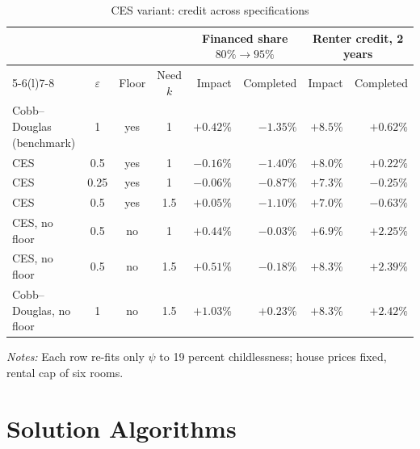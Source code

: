 \begin{table}[t]
\centering
\caption{CES variant: credit across specifications}
\label{tab:app-ces-credit}
\small\setlength{\tabcolsep}{4pt}
\begin{tabularx}{\textwidth}{@{}Xccc rr rr@{}}
\toprule
 & & & & \multicolumn{2}{c}{Financed share $80\%\to95\%$} & \multicolumn{2}{c}{Renter credit, 2 years} \\
\cmidrule(lr){5-6}\cmidrule(l){7-8}
 & $\varepsilon$ & Floor & Need $k$ & Impact & Completed & Impact & Completed \\
\midrule
Cobb--Douglas (benchmark) & 1 & yes & 1 & $+0.42\%$ & $-1.35\%$ & $+8.5\%$ & $+0.62\%$ \\
CES & 0.5 & yes & 1 & $-0.16\%$ & $-1.40\%$ & $+8.0\%$ & $+0.22\%$ \\
CES & 0.25 & yes & 1 & $-0.06\%$ & $-0.87\%$ & $+7.3\%$ & $-0.25\%$ \\
CES & 0.5 & yes & 1.5 & $+0.05\%$ & $-1.10\%$ & $+7.0\%$ & $-0.63\%$ \\
CES, no floor & 0.5 & no & 1 & $+0.44\%$ & $-0.03\%$ & $+6.9\%$ & $+2.25\%$ \\
CES, no floor & 0.5 & no & 1.5 & $+0.51\%$ & $-0.18\%$ & $+8.3\%$ & $+2.39\%$ \\
Cobb--Douglas, no floor & 1 & no & 1.5 & $+1.03\%$ & $+0.23\%$ & $+8.3\%$ & $+2.42\%$ \\
\bottomrule
\end{tabularx}
\par\smallskip
\begin{minipage}{0.95\linewidth}
\footnotesize\textit{Notes:} Each row re-fits only $\psi$ to 19 percent
childlessness; house prices fixed, rental cap of six rooms.
\end{minipage}
\end{table}

\section{Solution Algorithms}
\label{app:algorithms}


